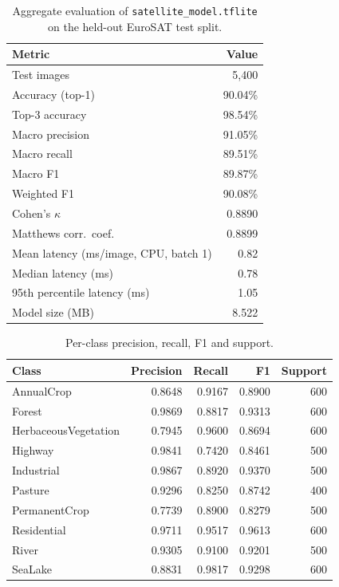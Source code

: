 \begin{table}[h]
\centering
\begin{tabular}{@{}lr@{}}
\toprule
\textbf{Metric} & \textbf{Value}\\
\midrule
Test images & 5{,}400\\
Accuracy (top-1) & 90.04\%\\
Top-3 accuracy & 98.54\%\\
Macro precision & 91.05\%\\
Macro recall & 89.51\%\\
Macro F1 & 89.87\%\\
Weighted F1 & 90.08\%\\
Cohen's $\kappa$ & 0.8890\\
Matthews corr.\ coef. & 0.8899\\
Mean latency (ms/image, CPU, batch 1) & 0.82\\
Median latency (ms) & 0.78\\
95th percentile latency (ms) & 1.05\\
Model size (MB) & 8.522\\
\bottomrule
\end{tabular}
\caption{Aggregate evaluation of \texttt{satellite\_model.tflite} on the held-out EuroSAT test split.}
\label{tab:eval-aggregate}
\end{table}

\begin{table}[h]
\centering
\begin{tabular}{@{}lrrrr@{}}
\toprule
\textbf{Class} & \textbf{Precision} & \textbf{Recall} & \textbf{F1} & \textbf{Support}\\
\midrule
AnnualCrop & 0.8648 & 0.9167 & 0.8900 & 600\\
Forest & 0.9869 & 0.8817 & 0.9313 & 600\\
HerbaceousVegetation & 0.7945 & 0.9600 & 0.8694 & 600\\
Highway & 0.9841 & 0.7420 & 0.8461 & 500\\
Industrial & 0.9867 & 0.8920 & 0.9370 & 500\\
Pasture & 0.9296 & 0.8250 & 0.8742 & 400\\
PermanentCrop & 0.7739 & 0.8900 & 0.8279 & 500\\
Residential & 0.9711 & 0.9517 & 0.9613 & 600\\
River & 0.9305 & 0.9100 & 0.9201 & 500\\
SeaLake & 0.8831 & 0.9817 & 0.9298 & 600\\
\bottomrule
\end{tabular}
\caption{Per-class precision, recall, F1 and support.}
\label{tab:eval-per-class}
\end{table}
